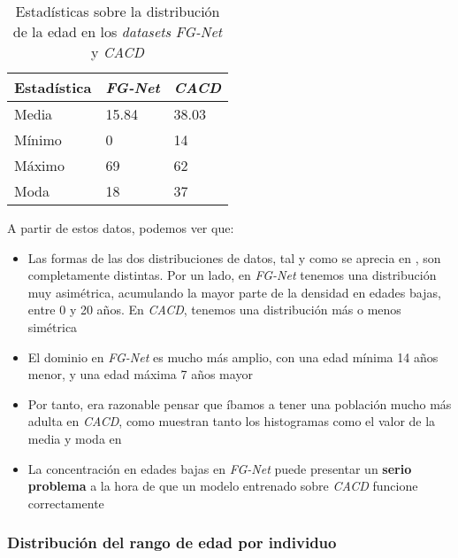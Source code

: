 \begin{table}[H]
\centering
\begin{tabular}{|l|l|l|}
    \hline
    \textbf{Estadística} & \textbf{\textit{FG-Net}} & \textbf{\textit{CACD}} \\
    \hline

    Media  & 15.84 & 38.03 \\
    Mínimo & 0     & 14    \\
    Máximo & 69    & 62    \\
    Moda   & 18    & 37    \\

    \hline

\end{tabular}
    \caption{Estadísticas sobre la distribución de la edad en los \textit{datasets} \textit{FG-Net} y \textit{CACD}}
    \label{table:conjunta_fgnet_cacd_estadisticas_edad}
\end{table}

A partir de estos datos, podemos ver que:

\begin{itemize}
    \item Las formas de las dos distribuciones de datos, tal y como se aprecia en , son completamente distintas. Por un lado, en \textit{FG-Net} tenemos una distribución muy asimétrica, acumulando la mayor parte de la densidad en edades bajas, entre 0 y 20 años. En \textit{CACD}, tenemos una distribución más o menos simétrica
    \item El dominio en \textit{FG-Net} es mucho más amplio, con una edad mínima 14 años menor, y una edad máxima 7 años mayor
    \item Por tanto, era razonable pensar que íbamos a tener una población mucho más adulta en \textit{CACD}, como muestran tanto los histogramas como el valor de la media y moda en 
    \item La concentración en edades bajas en \textit{FG-Net} puede presentar un \textbf{serio problema} a la hora de que un modelo entrenado sobre \textit{CACD} funcione correctamente
\end{itemize}

\subsubsection{Distribución del rango de edad por individuo}

